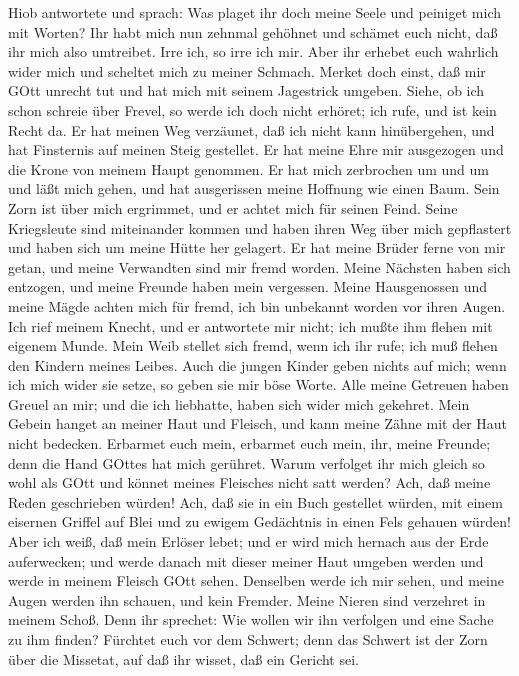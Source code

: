  Hiob antwortete und sprach:  Was plaget ihr
doch meine Seele und peiniget mich mit Worten?  Ihr habt
mich nun zehnmal gehöhnet und schämet euch nicht, daß ihr mich also
umtreibet.  Irre ich, so irre ich mir.  Aber ihr
erhebet euch wahrlich wider mich und scheltet mich zu meiner Schmach.
 Merket doch einst, daß mir GOtt unrecht tut und hat mich
mit seinem Jagestrick umgeben.  Siehe, ob ich schon schreie
über Frevel, so werde ich doch nicht erhöret; ich rufe, und ist kein
Recht da.  Er hat meinen Weg verzäunet, daß ich nicht kann
hinübergehen, und hat Finsternis auf meinen Steig gestellet.
 Er hat meine Ehre mir ausgezogen und die Krone von meinem
Haupt genommen.  Er hat mich zerbrochen um und um und läßt
mich gehen, und hat ausgerissen meine Hoffnung wie einen Baum.
 Sein Zorn ist über mich ergrimmet, und er achtet mich für
seinen Feind.  Seine Kriegsleute sind miteinander kommen
und haben ihren Weg über mich gepflastert und haben sich um meine Hütte
her gelagert.  Er hat meine Brüder ferne von mir getan, und
meine Verwandten sind mir fremd worden.  Meine Nächsten
haben sich entzogen, und meine Freunde haben mein vergessen.
 Meine Hausgenossen und meine Mägde achten mich für fremd,
ich bin unbekannt worden vor ihren Augen.  Ich rief meinem
Knecht, und er antwortete mir nicht; ich mußte ihm flehen mit eigenem
Munde.  Mein Weib stellet sich fremd, wenn ich ihr rufe;
ich muß flehen den Kindern meines Leibes.  Auch die jungen
Kinder geben nichts auf mich; wenn ich mich wider sie setze, so geben
sie mir böse Worte.  Alle meine Getreuen haben Greuel an
mir; und die ich liebhatte, haben sich wider mich gekehret.
 Mein Gebein hanget an meiner Haut und Fleisch, und kann
meine Zähne mit der Haut nicht bedecken.  Erbarmet euch
mein, erbarmet euch mein, ihr, meine Freunde; denn die Hand GOttes hat
mich gerühret.  Warum verfolget ihr mich gleich so wohl als
GOtt und könnet meines Fleisches nicht satt werden?  Ach,
daß meine Reden geschrieben würden! Ach, daß sie in ein Buch gestellet
würden,  mit einem eisernen Griffel auf Blei und zu ewigem
Gedächtnis in einen Fels gehauen würden!  Aber ich weiß,
daß mein Erlöser lebet; und er wird mich hernach aus der Erde
auferwecken;  und werde danach mit dieser meiner Haut
umgeben werden und werde in meinem Fleisch GOtt sehen. 
Denselben werde ich mir sehen, und meine Augen werden ihn schauen, und
kein Fremder. Meine Nieren sind verzehret in meinem Schoß. 
Denn ihr sprechet: Wie wollen wir ihn verfolgen und eine Sache zu ihm
finden?  Fürchtet euch vor dem Schwert; denn das Schwert
ist der Zorn über die Missetat, auf daß ihr wisset, daß ein Gericht sei.

